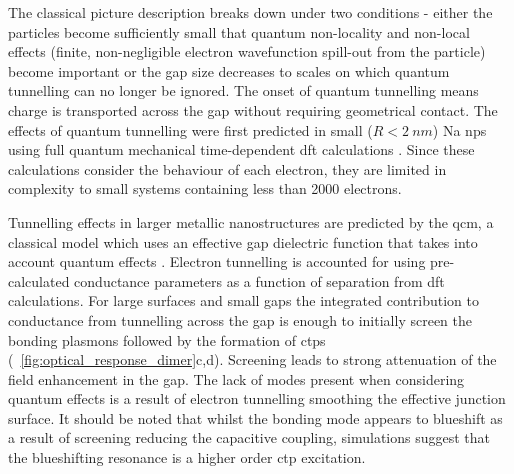 \documentclass{article}
\begin{document}
The classical picture description breaks down under two conditions - either the particles become sufficiently small that quantum non-locality and non-local effects (finite, non-negligible electron wavefunction spill-out from the particle) become important or the gap size decreases to scales on which quantum tunnelling can no longer be ignored. The onset of quantum tunnelling means charge is transported across the gap without requiring geometrical contact. The effects of quantum tunnelling were first predicted in small ($R<\SI{2}{nm}$) Na \glspl{np} using full quantum mechanical time-dependent \gls{dft} calculations \cite{zuloaga2009}. Since these calculations consider the behaviour of each electron, they are limited in complexity to small systems containing less than 2000 electrons.

Tunnelling effects in larger metallic nanostructures are predicted by the \gls{qcm}, a classical model which uses an effective gap dielectric function that takes into account quantum effects \cite{esteban2012}. Electron tunnelling is accounted for using pre-calculated conductance parameters as a function of separation from \gls{dft} calculations. For large surfaces and small gaps the integrated contribution to conductance from tunnelling across the gap is enough to initially screen the bonding plasmons followed by the formation of \glspl{ctp} (\figurename~\ref{fig:optical_response_dimer}c,d). Screening leads to strong attenuation of the field enhancement in the gap. The lack of modes present when considering quantum effects is a result of electron tunnelling smoothing the effective junction surface. It should be noted that whilst the bonding mode appears to blueshift as a result of screening reducing the capacitive coupling, simulations suggest that the blueshifting resonance is a higher order \gls{ctp} excitation.
\end{document}
